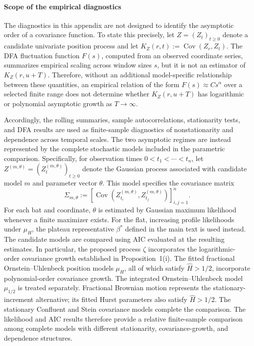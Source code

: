 \documentclass[preprint,12pt,authoryear]{elsarticle}
\begin{document}
\paragraph{Scope of the empirical diagnostics}
The diagnostics in this appendix are not designed to identify the
asymptotic order of a covariance function. To state this precisely, let
\(Z=(Z_t)_{t\geq0}\) denote a candidate univariate position process and let
\(K_Z(r,t):=\operatorname{Cov}(Z_r,Z_t)\). The DFA fluctuation function
\(F(s)\), computed from an observed coordinate series, summarizes empirical
scaling across window sizes \(s\), but it is not an estimator of
\(K_Z(r,u+T)\). Therefore, without an additional model-specific relationship
between these quantities, an empirical relation of the form
\(F(s)\approx C s^\alpha\) over a selected finite range does not determine
whether \(K_Z(r,u+T)\) has logarithmic or polynomial asymptotic growth as
\(T\to\infty\).

Accordingly, the rolling summaries, sample autocorrelations, stationarity
tests, and DFA results are used as finite-sample diagnostics of
nonstationarity and dependence across temporal scales. The two asymptotic
regimes are instead represented by the complete stochastic models included
in the parametric comparison. Specifically, for observation times
\(0<t_1<\cdots<t_n\), let
\(Z^{(m,\theta)}=(Z_t^{(m,\theta)})_{t\geq0}\) denote the Gaussian process
associated with candidate model \(m\) and parameter vector \(\theta\). This
model specifies the covariance matrix
\[
\Sigma_{m,\theta}
:=
\left[
\operatorname{Cov}
\left(
Z_{t_i}^{(m,\theta)},
Z_{t_j}^{(m,\theta)}
\right)
\right]_{i,j=1}^{n}.
\]
For each bat and coordinate, \(\theta\) is estimated by Gaussian maximum
likelihood whenever a finite maximizer exists. For the flat, increasing
profile likelihoods under \(\mu_H\), the plateau representative \(\beta^*\)
defined in the main text is used instead. The candidate models are compared
using AIC evaluated at the resulting estimates. In particular,
the proposed process \(\zeta\) incorporates the logarithmic-order covariance
growth established in Proposition~1(i). The fitted fractional
Ornstein--Uhlenbeck position models \(\mu_H\), all of which satisfy
\(\widehat H>1/2\), incorporate polynomial-order covariance growth. The
integrated Ornstein--Uhlenbeck model \(\mu_{1/2}\) is treated separately.
Fractional Brownian motion represents the stationary-increment alternative;
its fitted Hurst parameters also satisfy \(\widehat H>1/2\). The stationary
Confluent and Stein covariance models complete the comparison. The likelihood
and AIC results therefore provide a relative finite-sample comparison among
complete models with different stationarity, covariance-growth, and
dependence structures.
\end{document}
